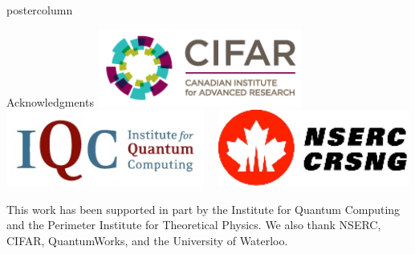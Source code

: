 \documentclass[final]{beamer} %
\begin{document}
\begin{frame}{}
\begin{columns}
\begin{column}{.33\textwidth}
\begin{beamercolorbox}[center,wd=\textwidth]{postercolumn}
\begin{minipage}[T]{.95\textwidth}
           \begin{block}{\large Acknowledgments}
             \centering 
             \includegraphics[height=1in]{figures/CIFAR_Logo.PNG} \ \ \includegraphics[height=1in]{figures/IQC_Logo.PNG}  \ \ \includegraphics[height=1in]{figures/NSERC_Logo.PNG}

            This work has been supported in part by the Institute for Quantum Computing and the Perimeter Institute for Theoretical Physics. We also thank NSERC, CIFAR, QuantumWorks, and the University of Waterloo.


\end{block}
\end{minipage}
\end{beamercolorbox}
\end{column}
\end{columns}
\end{frame}
\end{document}
